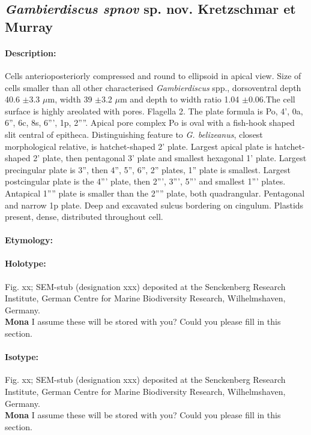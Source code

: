 \documentclass[12pt]{article}
\begin{document}
 \subsection{\emph{Gambierdiscus spnov} sp. nov. Kretzschmar et Murray}
 \paragraph{Description:} Cells anterioposteriorly compressed and round to ellipsoid in apical view. Size of cells smaller than all other characterised \emph{Gambierdiscus} spp., dorsoventral depth 40.6 $\pm$3.3 $\mu$m, width 39 $\pm$3.2 $\mu$m and depth to width ratio 1.04 $\pm$0.06.The cell surface is highly areolated with pores. Flagella 2. The plate formula is Po, 4', 0a, 6'', 6c, 8s, 6''', 1p, 2''''. 
Apical pore complex Po is oval with a fish-hook shaped slit central of epitheca. Distinguishing feature to \emph{G. belizeanus}, closest morphological relative, is hatchet-shaped 2' plate. Largest apical plate is hatchet-shaped 2' plate, then pentagonal 3' plate and smallest hexagonal 1' plate. Largest precingular plate is 3'', then 4'', 5'', 6'', 2'' plates, 1'' plate is smallest. Largest postcingular plate is the 4''' plate, then 2''', 3''', 5''' and smallest 1''' plates. Antapical 1'''' plate is smaller than the 2'''' plate, both quadrangular. Pentagonal and narrow 1p plate. Deep and excavated sulcus bordering on cingulum. Plastids present, dense, distributed throughout cell. 
 \paragraph{Etymology:} %
\paragraph{Holotype:} Fig. xx; SEM-stub (designation xxx) deposited at the Senckenberg Research Institute, German Centre for Marine Biodiversity Research, Wilhelmshaven, Germany. \\
\textbf{Mona} I assume these will be stored with you? Could you please fill in this section.
\paragraph{Isotype:} Fig. xx; SEM-stub (designation xxx) deposited at the Senckenberg Research Institute, German Centre for Marine Biodiversity Research, Wilhelmshaven, Germany. \\
\textbf{Mona} I assume these will be stored with you? Could you please fill in this section.
\end{document}
